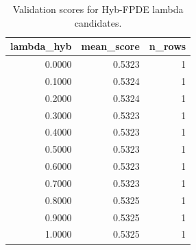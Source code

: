 \begin{table}[t]
\caption{Validation scores for Hyb-FPDE lambda candidates.}
\label{tab:lambda_distribution_computed}
\centering
\begin{tabular}{rrr}
\toprule
lambda\_hyb & mean\_score & n\_rows \\
\midrule
0.0000 & 0.5323 & 1 \\
0.1000 & 0.5324 & 1 \\
0.2000 & 0.5324 & 1 \\
0.3000 & 0.5323 & 1 \\
0.4000 & 0.5323 & 1 \\
0.5000 & 0.5323 & 1 \\
0.6000 & 0.5323 & 1 \\
0.7000 & 0.5323 & 1 \\
0.8000 & 0.5325 & 1 \\
0.9000 & 0.5325 & 1 \\
1.0000 & 0.5325 & 1 \\
\bottomrule
\end{tabular}

\end{table}
